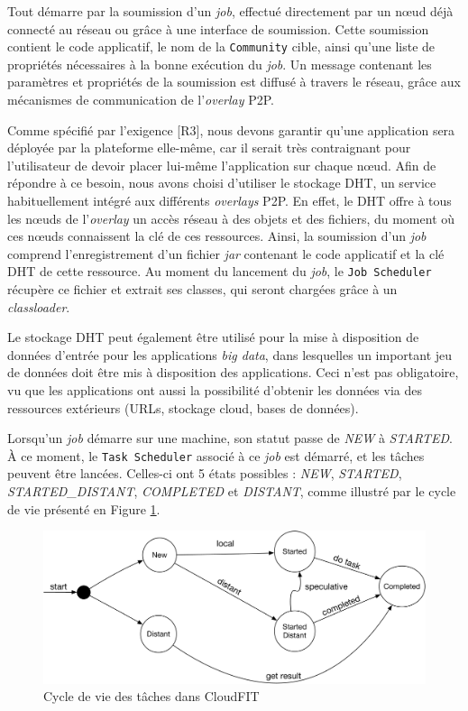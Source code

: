 Tout démarre par la soumission d'un \textit{job}, effectué directement par un n{\oe}ud déjà connecté au réseau ou grâce à une interface de soumission. Cette soumission contient le code applicatif, le nom de la \texttt{Community} cible, ainsi qu'une liste de propriétés nécessaires à la bonne exécution du \textit{job}. Un message contenant les paramètres et propriétés de la soumission est diffusé à travers le réseau, grâce aux mécanismes de communication de l'\textit{overlay} P2P.

Comme spécifié par l'exigence [R3], nous devons garantir qu'une application sera déployée par la plateforme elle-même, car il serait très contraignant pour l'utilisateur de devoir placer lui-même l'application sur chaque n{\oe}ud. Afin de répondre à ce besoin, nous avons choisi d'utiliser le stockage DHT, un service habituellement intégré aux différents \textit{overlays} P2P. En effet, le DHT offre à tous les n{\oe}uds de l'\textit{overlay} un accès réseau à des objets et des fichiers, du moment où ces n{\oe}uds connaissent la clé de ces ressources. Ainsi, la soumission d'un \textit{job} comprend l'enregistrement d'un fichier \textit{jar} contenant le code applicatif et la clé DHT de cette ressource. Au moment du lancement du \textit{job}, le \texttt{Job Scheduler} récupère ce fichier et extrait ses classes, qui seront chargées grâce à un \textit{classloader}. 

Le stockage DHT peut également être utilisé pour la mise à disposition de données d'entrée pour les applications \textit{big data}, dans lesquelles un important jeu de données doit être mis à disposition des applications. Ceci n'est pas obligatoire, vu que les applications ont aussi la possibilité d'obtenir les données via des ressources extérieurs (URLs, stockage cloud, bases de données).

Lorsqu'un \textit{job} démarre sur une machine, son statut passe de \textit{NEW} à \textit{STARTED}. À ce moment, le \texttt{Task Scheduler} associé à ce \textit{job} est démarré, et les tâches peuvent être lancées. Celles-ci ont 5 états possibles : \textit{NEW}, \textit{STARTED}, \textit{STARTED\_DISTANT}, \textit{COMPLETED} et \textit{DISTANT}, comme illustré par le cycle de vie présenté en Figure \ref{fig:etatsTasks}.

\begin{figure}
	\centering
	\includegraphics[width=0.65\linewidth]{img/lifecycle}
	\caption{Cycle de vie des tâches dans CloudFIT}\label{fig:etatsTasks}
\end{figure}

